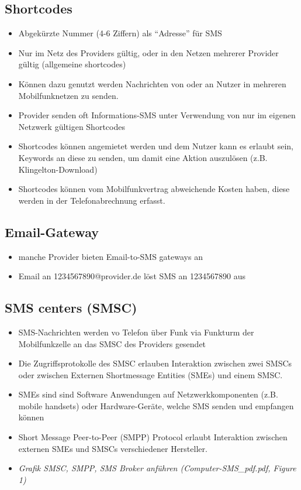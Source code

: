\documentclass[german,12pt,a4paper]{article}
\begin{document}
\subsection{Shortcodes}
\begin{itemize}
	\item Abgekürzte Nummer (4-6 Ziffern) als ``Adresse'' für SMS
	\item Nur im Netz des Providers gültig, oder in den Netzen mehrerer Provider gültig (allgemeine shortcodes)
	\item Können dazu genutzt werden Nachrichten von oder an Nutzer in mehreren Mobilfunknetzen zu senden.
	\item Provider senden oft Informations-SMS unter Verwendung von nur im eigenen Netzwerk gültigen Shortcodes
	\item Shortcodes können angemietet werden und dem Nutzer kann es erlaubt sein, Keywords an diese zu senden, um 
		damit eine Aktion auszulösen (z.B. Klingelton-Download)
	\item Shortcodes können vom Mobilfunkvertrag abweichende Kosten haben, diese werden in der Telefonabrechnung 
		erfasst.
\end{itemize}

\subsection{Email-Gateway}
\begin{itemize}
	\item manche Provider bieten Email-to-SMS gateways an
	\item Email an 1234567890@provider.de löst SMS an 1234567890 aus
\end{itemize}

\subsection{SMS centers (SMSC)}
\begin{itemize}
	\item SMS-Nachrichten werden vo Telefon über Funk via Funkturm der Mobilfunkzelle an das SMSC des Providers 
		gesendet
	\item Die Zugriffsprotokolle des SMSC erlauben Interaktion zwischen zwei SMSCs oder zwischen Externen Shortmessage 
		Entities (SMEs) und einem SMSC.
	\item SMEs sind sind Software Anwendungen auf Netzwerkkomponenten (z.B. mobile handsets) oder Hardware-Geräte, welche 
		SMS senden und empfangen können
	\item Short Message Peer-to-Peer (SMPP) Protocol erlaubt Interaktion zwischen externen SMEs und SMSCs 
		verschiedener Hersteller.
	\item \textit{Grafik SMSC, SMPP, SMS Broker anführen (Computer-SMS\_pdf.pdf, Figure 1)}
\end{itemize}
\end{document}
